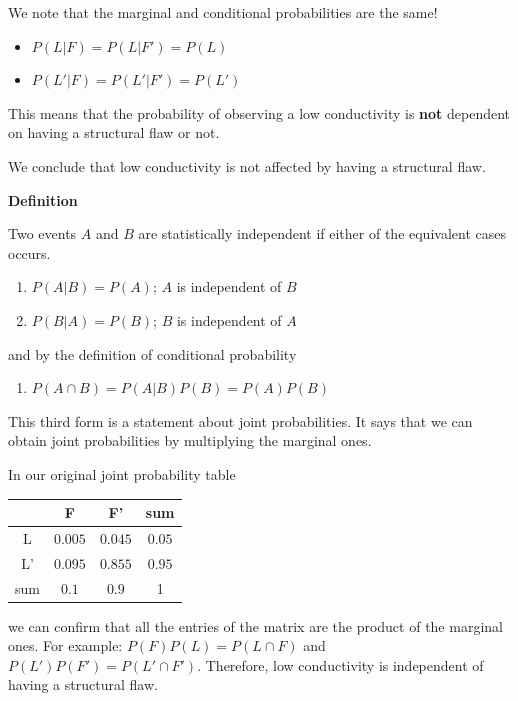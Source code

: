 \documentclass[
]{book}
\providecommand{\tightlist}{%
  \setlength{\itemsep}{0pt}\setlength{\parskip}{0pt}}
\begin{document}
We note that the marginal and conditional probabilities are the same!

\begin{itemize}
\tightlist
\item
  \(P(L| F)= P(L|F')=P(L)\)
\item
  \(P(L'| F)= P(L'|F')=P(L')\)
\end{itemize}

This means that the probability of observing a low conductivity is \textbf{not} dependent on having a structural flaw or not.

We conclude that low conductivity is not affected by having a structural flaw.

\textbf{Definition}

Two events \(A\) and \(B\) are statistically independent if either of the equivalent cases occurs.

\begin{enumerate}
\def\labelenumi{\arabic{enumi})}
\tightlist
\item
  \(P(A| B)= P(A)\); \(A\) is independent of \(B\)
\item
  \(P(B| A)= P(B)\); \(B\) is independent of \(A\)
\end{enumerate}

and by the definition of conditional probability

\begin{enumerate}
\def\labelenumi{\arabic{enumi})}
\setcounter{enumi}{2}
\tightlist
\item
  \(P(A\cap B)=P(A|B)P(B)=P(A)P(B)\)
\end{enumerate}

This third form is a statement about joint probabilities. It says that we can obtain joint probabilities by multiplying the marginal ones.

In our original joint probability table

\begin{longtable}[]{@{}cccc@{}}
\toprule
& F & F' & sum \\
\midrule
\endhead
L & \(0.005\) & \(0.045\) & \(0.05\) \\
L' & \(0.095\) & \(0.855\) & \(0.95\) \\
sum & \(0.1\) & \(0.9\) & 1 \\
\bottomrule
\end{longtable}

we can confirm that all the entries of the matrix are the product of the marginal ones. For example: \(P(F)P(L)= P( L \cap F)\) and \(P(L')P(F')=P(L' \cap F')\). Therefore, low conductivity is independent of having a structural flaw.
\end{document}

